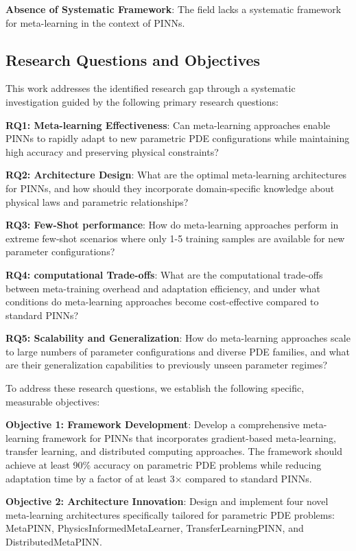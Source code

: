 \documentclass[review]{elsarticle}
\begin{document}
\textbf{Absence of Systematic Framework}: The field lacks a systematic framework for meta-learning in the context of PINNs.

\subsection{Research Questions and Objectives}

This work addresses the identified research gap through a systematic investigation guided by the following primary research questions:

\textbf{RQ1: Meta-learning Effectiveness}: Can meta-learning approaches enable PINNs to rapidly adapt to new parametric PDE configurations while maintaining high accuracy and preserving physical constraints?

\textbf{RQ2: Architecture Design}: What are the optimal meta-learning architectures for PINNs, and how should they incorporate domain-specific knowledge about physical laws and parametric relationships?

\textbf{RQ3: Few-Shot performance}: How do meta-learning approaches perform in extreme few-shot scenarios where only 1-5 training samples are available for new parameter configurations?

\textbf{RQ4: computational Trade-offs}: What are the computational trade-offs between meta-training overhead and adaptation efficiency, and under what conditions do meta-learning approaches become cost-effective compared to standard PINNs?

\textbf{RQ5: Scalability and Generalization}: How do meta-learning approaches scale to large numbers of parameter configurations and diverse PDE families, and what are their generalization capabilities to previously unseen parameter regimes?

To address these research questions, we establish the following specific, measurable objectives:

\textbf{Objective 1: Framework Development}: Develop a comprehensive meta-learning framework for PINNs that incorporates gradient-based meta-learning, transfer learning, and distributed computing approaches. The framework should achieve at least 90\% accuracy on parametric PDE problems while reducing adaptation time by a factor of at least 3× compared to standard PINNs.

\textbf{Objective 2: Architecture Innovation}: Design and implement four novel meta-learning architectures specifically tailored for parametric PDE problems: MetaPINN, PhysicsInformedMetaLearner, TransferLearningPINN, and DistributedMetaPINN.
\end{document}
